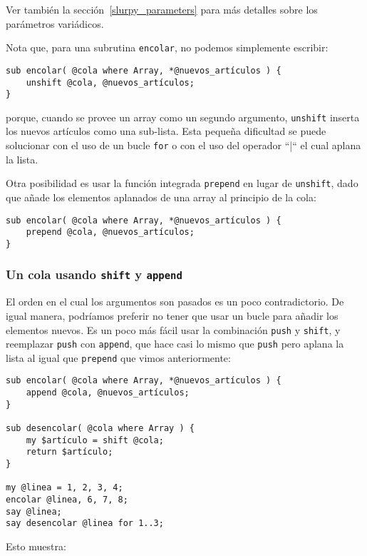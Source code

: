 Ver también la sección~\ref{slurpy_parameters} para más detalles
sobre los parámetros variádicos.

Nota que, para una subrutina \verb|encolar|, no podemos simplemente
escribir:
\begin{verbatim}
sub encolar( @cola where Array, *@nuevos_artículos ) {
    unshift @cola, @nuevos_artículos;
}
\end{verbatim}
%
porque, cuando se provee un array como un segundo argumento,
{\tt unshift} inserta los nuevos artículos como una sub-lista.
Esta pequeña dificultad se puede solucionar con el uso de 
un bucle \verb|for| o con el uso del operador ``|`` el cual aplana
la lista. 

Otra posibilidad es usar la función integrada {\tt prepend} 
en lugar de {\tt unshift}, dado que añade los elementos 
aplanados de una array al principio de la cola:

\begin{verbatim}
sub encolar( @cola where Array, *@nuevos_artículos ) {
	prepend @cola, @nuevos_artículos;
}
\end{verbatim}

\subsubsection{Un cola usando {\tt shift} y {\tt append}}

El orden en el cual los argumentos son pasados es un
poco contradictorio. De igual manera, podríamos preferir 
no tener que usar un bucle para añadir los elementos nuevos.
Es un poco más fácil usar la combinación {\tt push} y {\tt shift},
y reemplazar {\tt push} con {\tt append}, que hace casi lo
mismo que {\tt push} pero aplana la lista al igual que 
{\tt prepend} que vimos anteriormente:

\begin{verbatim}
sub encolar( @cola where Array, *@nuevos_artículos ) {
	append @cola, @nuevos_artículos;
}

sub desencolar( @cola where Array ) {
	my $artículo = shift @cola;
	return $artículo;
}

my @linea = 1, 2, 3, 4;
encolar @linea, 6, 7, 8;
say @linea;
say desencolar @linea for 1..3;
\end{verbatim}

Esto muestra:

